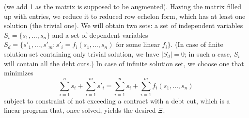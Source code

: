 \documentclass[10pt]{article}
\begin{document}
(we add 1 as the matrix is supposed to be augmented). Having the matrix filled up with entries, we reduce it to reduced row echelon form, which has at least one solution (the trivial one).
We will obtain two sets: a set of independent variables $S_i = \{ s_1, \dots, s_n \}$ and a set of dependent variables $S_d = \{ s'_1, \dots, s'_m \colon s'_i = f_i(s_1, \dots, s_n) \text{ for some linear } f_i \}$. (In case of finite solution set containing only trivial solution, we have $|S_d| = 0$; in such a case, $S_i$ will contain all the debt cuts.) In case of infinite solution set, we choose one that minimizes
\[
\sum_{i = 1}^{n} s_i + \sum_{i = 1}^{m} s'_i = \sum_{i = 1}^{n} s_i + \sum_{i = 1}^{m} f_i(s_1, \dots, s_n) 
\]
subject to constraint of not exceeding a contract with a debt cut, which is a linear program that, once solved, yields the desired $\Xi$.
\end{document}
